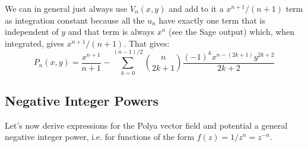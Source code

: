 \documentclass[12pt]{article}
\begin{document}
\medskip
We can in general just always use $V_n(x,y)$ and add to it a $x^{n+1}/(n+1)$ term as integration constant because all the $u_n$ have exactly one term that is independent of $y$ and that term is always $x^n$ (see the Sage output) which, when integrated, gives $x^{n+1}/(n+1)$. That gives:
\begin{equation}
\label{Eq:PolyaPotentialPositivePowers}	
\boxed{	
	P_n(x,y) = \frac{x^{n+1}}{n+1} 
	-\sum_{k=0}^{(n-1)/2} \binom{n}{2k+1} \frac{(-1)^k x^{n-(2k+1)} y^{2k+2}}{2k+2}
}
\end{equation}

\subsection{Negative Integer Powers}
Let's now derive expressions for the Polya vector field and potential a general negative integer power, i.e. for functions of the form $f(z) = 1/z^n = z^{-n}$.

  
\end{document}
